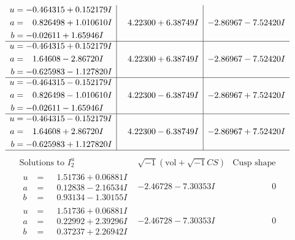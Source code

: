 \documentclass[1p]{elsarticle_modified}
\theoremstyle{definition}
\newcommand{\I}{\sqrt{-1}}
\begin{document}
$$\begin{array}{c|c|c}
\begin{aligned}
u &= -0.464315 + 0.152179 I \\
a &= \phantom{-}0.826498 + 1.010610 I \\
b &= -0.02611 + 1.65946 I\end{aligned}
 & \phantom{-}4.22300 + 6.38749 I & -2.86967 - 7.52420 I \\ \hline\begin{aligned}
u &= -0.464315 + 0.152179 I \\
a &= \phantom{-}1.64608 - 2.86720 I \\
b &= -0.625983 - 1.127820 I\end{aligned}
 & \phantom{-}4.22300 + 6.38749 I & -2.86967 - 7.52420 I \\ \hline\begin{aligned}
u &= -0.464315 - 0.152179 I \\
a &= \phantom{-}0.826498 - 1.010610 I \\
b &= -0.02611 - 1.65946 I\end{aligned}
 & \phantom{-}4.22300 - 6.38749 I & -2.86967 + 7.52420 I \\ \hline\begin{aligned}
u &= -0.464315 - 0.152179 I \\
a &= \phantom{-}1.64608 + 2.86720 I \\
b &= -0.625983 + 1.127820 I\end{aligned}
 & \phantom{-}4.22300 - 6.38749 I & -2.86967 + 7.52420 I\\
 \hline 
 \end{array}$$\newpage$$\begin{array}{c|c|c}  
\text{Solutions to }I^u_{2}& \I (\text{vol} + \sqrt{-1}CS) & \text{Cusp shape}\\
 \hline 
\begin{aligned}
u &= \phantom{-}1.51736 + 0.06881 I \\
a &= \phantom{-}0.12838 - 2.16534 I \\
b &= \phantom{-}0.93134 - 1.30155 I\end{aligned}
 & -2.46728 - 7.30353 I & \phantom{-0.000000 } 0 \\ \hline\begin{aligned}
u &= \phantom{-}1.51736 + 0.06881 I \\
a &= \phantom{-}0.22992 + 2.39296 I \\
b &= \phantom{-}0.37237 + 2.26942 I\end{aligned}
 & -2.46728 - 7.30353 I & \phantom{-0.000000 } 0 \\ \hline\begin{aligned}

\end{aligned}
\end{array}$$
\end{document}
